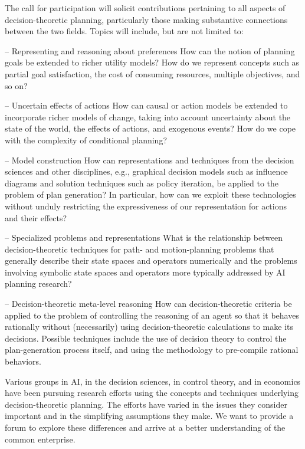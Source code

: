 The call for participation will solicit contributions pertaining to all
aspects of decision-theoretic planning, particularly those making
substantive connections between the two fields.  Topics will include, but
are not limited to:

 -- Representing and reasoning about preferences
      How can the notion of planning goals be extended to 
      richer utility models?  How do we represent concepts such as
      partial goal satisfaction, the cost of consuming resources, 
      multiple objectives, and so on?

 -- Uncertain effects of actions 
      How can causal or action models be extended to incorporate richer models
      of change, taking into account uncertainty about the state of the world,
      the effects of actions, and exogenous events?  How do we cope with the
      complexity of conditional planning?

 -- Model construction
      How can representations and techniques from the decision sciences 
      and other disciplines, e.g., graphical decision models such as 
      influence diagrams and solution techniques such as policy 
      iteration, be applied to the problem of plan generation?  In
      particular, how can we exploit these technologies without unduly
      restricting the expressiveness of our representation for actions and
      their effects?

 -- Specialized problems and representations
      What is the relationship between decision-theoretic techniques
      for path- and motion-planning problems that generally describe 
      their state spaces and operators numerically and the problems 
      involving symbolic state spaces and operators more typically 
      addressed by AI planning research?

 -- Decision-theoretic meta-level reasoning
      How can decision-theoretic criteria be applied to the 
      problem of controlling the reasoning of an agent so that 
      it behaves rationally without (necessarily) using 
      decision-theoretic calculations to make its decisions. 
      Possible techniques include the use of decision theory 
      to control the plan-generation process itself, and 
      using the methodology to pre-compile rational behaviors.

Various groups in AI, in the decision sciences, in control 
theory, and in economics have been pursuing research efforts 
using the concepts and techniques underlying decision-theoretic 
planning.  The efforts have varied in the issues they consider
important and in the simplifying assumptions they make. 
We want to provide a forum to explore these differences 
and arrive at a better understanding of the common enterprise.

